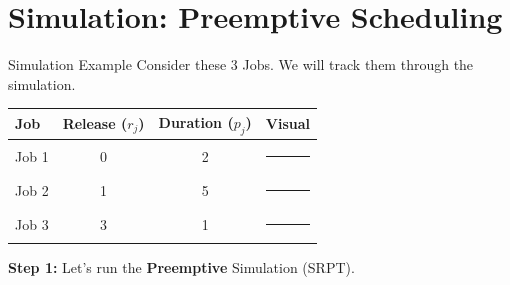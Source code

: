 \documentclass[aspectratio=169, 12pt]{beamer}
\begin{document}
\section{Simulation: Preemptive Scheduling}

\begin{frame}{Simulation Example}
    Consider these 3 Jobs. We will track them through the simulation.
    
    \begin{table}
    \centering
    \begin{tabular}{lccc}
    \toprule
    \textbf{Job} & \textbf{Release ($r_j$)} & \textbf{Duration ($p_j$)} & \textbf{Visual} \\
    \midrule
    Job 1 & 0 & 2 & \textcolor{job1}{\rule{1cm}{0.3cm}} \\
    Job 2 & 1 & 5 & \textcolor{job2}{\rule{2.5cm}{0.3cm}} \\
    Job 3 & 3 & 1 & \textcolor{job3}{\rule{0.5cm}{0.3cm}} \\
    \bottomrule
    \end{tabular}
    \end{table}

    \vspace{0.5cm}
    \textbf{Step 1:} Let's run the \textbf{Preemptive} Simulation (SRPT).
\end{frame}
\end{document}
